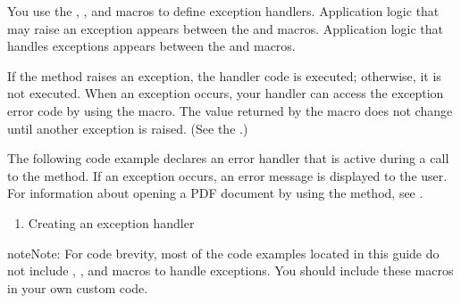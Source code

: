 \documentclass[letterpaper,12pt,english,openany,oneside]{sphinxmanual}
\begin{document}
You use the , , and  macros to define exception handlers. Application logic that may raise an exception appears between the  and  macros. Application logic that handles exceptions appears between the  and  macros.

If the method raises an exception, the handler code is executed; otherwise, it is not executed. When an exception occurs, your handler can access the exception error code by using the  macro. The value returned by the  macro does not change until another exception is raised. (See the .)

The following code example declares an error handler that is active during a call to the  method. If an exception occurs, an error message is displayed to the user. For information about opening a PDF document by using the  method, see .
\begin{enumerate}
%
\item {} 
Creating an exception handler

\end{enumerate}

\begin{sphinxVerbatim}[commandchars=\\\{\}]
        
\end{sphinxVerbatim}

\begin{sphinxadmonition}{note}{Note:}
For code brevity, most of the code examples located in this guide do not include , , and  macros to handle exceptions. You should include these macros in your own custom code.
\end{sphinxadmonition}
\end{document}
